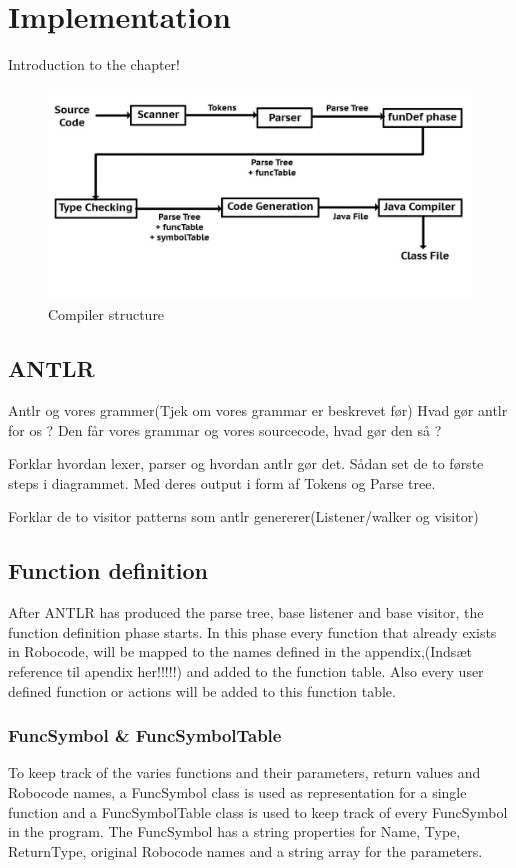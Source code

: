 \chapter{Implementation}
Introduction to the chapter!

\begin{figure}[!ht]
\centering
\includegraphics[scale=0.35]{billeder/compilerStructure}
\caption{Compiler structure}
\label{cs}
\end{figure}


\section{ANTLR}
Antlr og vores grammer(Tjek om vores grammar er beskrevet før)
Hvad gør antlr for os ?
Den får vores grammar og vores sourcecode, hvad gør den så ?


Forklar hvordan lexer, parser og hvordan antlr gør det. Sådan set de to første steps i diagrammet. Med deres output i form af Tokens og Parse tree.

Forklar de to visitor patterns som antlr genererer(Listener/walker og visitor)
\section{Function definition}
After ANTLR has produced the parse tree, base listener and base visitor, the function definition phase starts. In this phase every function that already exists in Robocode, will be mapped to the names defined in the appendix,(Indsæt reference til apendix her!!!!!) and added to the function table. Also every user defined function or actions will be added to this function table. 

\subsection{FuncSymbol \& FuncSymbolTable}
To keep track of the varies functions and their parameters, return values and Robocode names, a FuncSymbol class is used as representation for a single function and a FuncSymbolTable class is used to keep track of every FuncSymbol in the program.
The FuncSymbol has a string properties for Name, Type, ReturnType, original Robocode names and a string array for the parameters.

